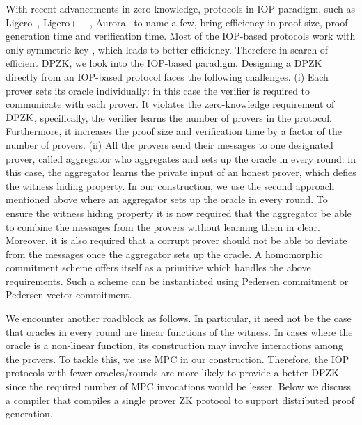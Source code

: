 With recent advancements in zero-knowledge, protocols in IOP paradigm, such as Ligero~\cite{ligero}, Ligero++~\cite{ligero++}, Aurora~\cite{aurora} to name a few, bring efficiency in proof size, proof generation time and verification time. Most of the IOP-based protocols work with only symmetric key , which leads to better efficiency. Therefore in search of efficient DPZK, we look into the IOP-based paradigm. Designing a DPZK directly from an IOP-based protocol faces the following challenges. (i) Each prover sets its oracle individually: in this case the verifier is required to communicate with each prover. It violates the zero-knowledge requirement of $\text{DPZK}$, specifically, the verifier learns the number of provers in the protocol. Furthermore, it increases the proof size and verification time by a factor of the number of provers. (ii) All the provers send their messages to one designated prover, called aggregator who aggregates and sets up the oracle in every round: in this case, the aggregator learns the private input of an honest prover, which defies the witness hiding property. 
In our construction, we use the second approach mentioned above where an aggregator sets up the oracle in every round. To ensure the witness hiding property it is now required that the aggregator be able to combine the messages from the provers without learning them in clear. Moreover, it is also required that a corrupt prover should not be able to deviate from the messages once the aggregator sets up the oracle. A homomorphic commitment scheme offers itself as a primitive which handles the above requirements. Such a scheme can be instantiated using Pedersen commitment or Pedersen vector commitment.

We encounter another roadblock as follows. In particular, it need not be the case that oracles in every round are linear functions of the witness. In cases where the oracle is a non-linear function, its construction may involve interactions among the provers. To tackle this, we use MPC in our construction. Therefore, the IOP protocols with fewer oracles/rounds are more likely to provide a better $\text{DPZK}$ since the required number of MPC invocations would be lesser. Below we discuss a compiler that compiles a
single prover ZK protocol to support distributed proof generation.  

